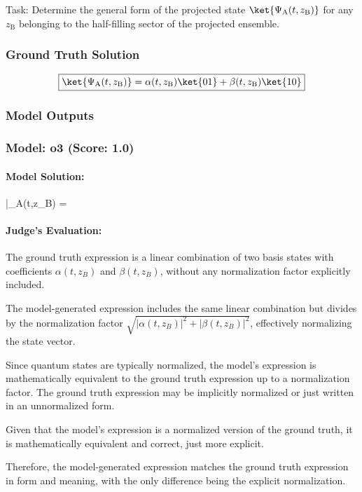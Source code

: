 \documentclass[10pt]{article}
\begin{document}
Task:
Determine the general form of the projected state $\ket{\Psi_{\mathrm{A}}(t,z_\mathrm{B})}$ for any $z_\mathrm{B}$ belonging to the half-filling sector of the projected ensemble.

\subsubsection*{Ground Truth Solution}
\[ \boxed{\ket{\Psi_{\mathrm{A}}(t,z_\mathrm{B})} = \alpha(t,z_\mathrm{B})\ket{01} + \beta(t,z_\mathrm{B})\ket{10}} \]

\subsubsection*{Model Outputs}
\subsubsection*{Model: o3 (Score: 1.0)}
\paragraph*{Model Solution:}
%
\displaystyle 
|\Psi_{A}(t,z_{B})\rangle
=
       { }

\paragraph*{Judge's Evaluation:}

The ground truth expression is a linear combination of two basis states with coefficients \(\alpha(t,z_B)\) and \(\beta(t,z_B)\), without any normalization factor explicitly included.

The model-generated expression includes the same linear combination but divides by the normalization factor \(\sqrt{|\alpha(t,z_B)|^2 + |\beta(t,z_B)|^2}\), effectively normalizing the state vector.

Since quantum states are typically normalized, the model's expression is mathematically equivalent to the ground truth expression up to a normalization factor. The ground truth expression may be implicitly normalized or just written in an unnormalized form.

Given that the model's expression is a normalized version of the ground truth, it is mathematically equivalent and correct, just more explicit.

Therefore, the model-generated expression matches the ground truth expression in form and meaning, with the only difference being the explicit normalization.
\end{document}
